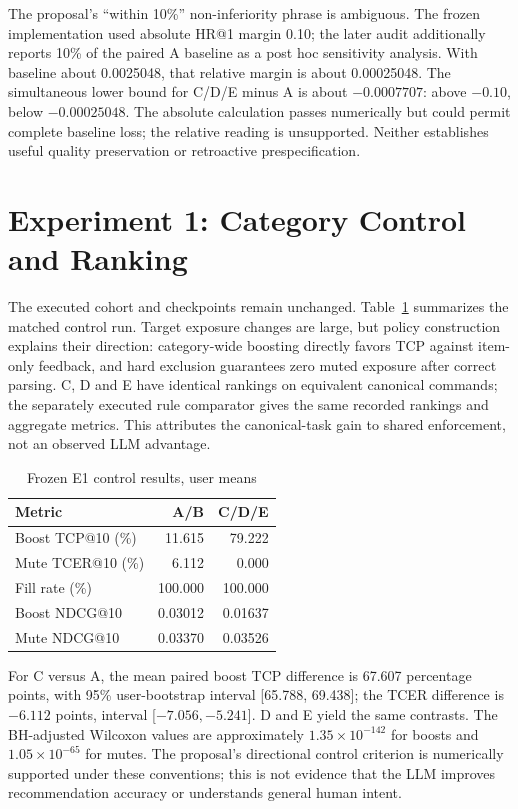 \documentclass[conference]{IEEEtran}
\begin{document}
The proposal's ``within 10\%'' non-inferiority phrase is ambiguous. The frozen implementation used absolute HR@1 margin 0.10; the later audit additionally reports 10\% of the paired A baseline as a post hoc sensitivity analysis. With baseline about 0.0025048, that relative margin is about 0.00025048. The simultaneous lower bound for C/D/E minus A is about $-0.0007707$: above $-0.10$, below $-0.00025048$. The absolute calculation passes numerically but could permit complete baseline loss; the relative reading is unsupported. Neither establishes useful quality preservation or retroactive prespecification.

\section{Experiment 1: Category Control and Ranking}
The executed cohort and checkpoints remain unchanged. Table~\ref{tab:e1} summarizes the matched control run. Target exposure changes are large, but policy construction explains their direction: category-wide boosting directly favors TCP against item-only feedback, and hard exclusion guarantees zero muted exposure after correct parsing. C, D and E have identical rankings on equivalent canonical commands; the separately executed rule comparator gives the same recorded rankings and aggregate metrics. This attributes the canonical-task gain to shared enforcement, not an observed LLM advantage.

\begin{table}[t]\centering\small
\caption{Frozen E1 control results, user means}\label{tab:e1}
\begin{tabular}{lrr}\toprule
Metric & A/B & C/D/E\\\midrule
Boost TCP@10 (\%) &11.615&79.222\\
Mute TCER@10 (\%) &6.112&0.000\\
Fill rate (\%) &100.000&100.000\\
Boost NDCG@10 &0.03012&0.01637\\
Mute NDCG@10 &0.03370&0.03526\\\bottomrule
\end{tabular}\end{table}

For C versus A, the mean paired boost TCP difference is 67.607 percentage points, with 95\% user-bootstrap interval [65.788, 69.438]; the TCER difference is $-6.112$ points, interval [$-7.056,-5.241$]. D and E yield the same contrasts. The BH-adjusted Wilcoxon values are approximately $1.35\times10^{-142}$ for boosts and $1.05\times10^{-65}$ for mutes. The proposal's directional control criterion is numerically supported under these conventions; this is not evidence that the LLM improves recommendation accuracy or understands general human intent.
\end{document}
